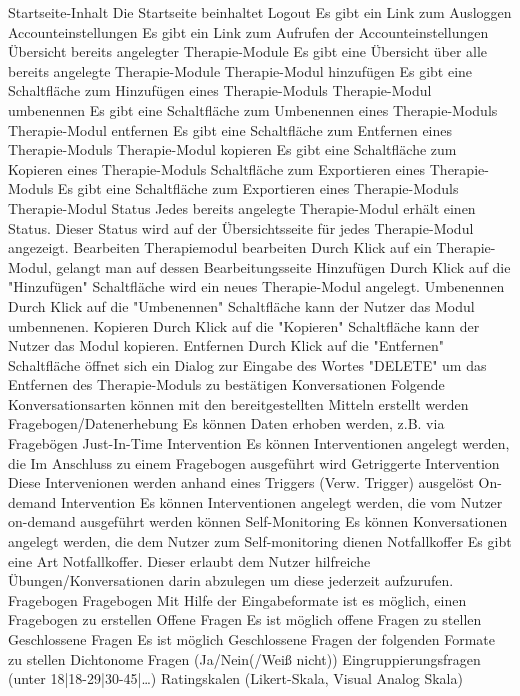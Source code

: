 Startseite-Inhalt		Die Startseite beinhaltet
	Logout	Es gibt ein Link zum Ausloggen
	Accounteinstellungen	Es gibt ein Link zum Aufrufen der Accounteinstellungen
	Übersicht bereits angelegter Therapie-Module	Es gibt eine Übersicht über alle bereits angelegte Therapie-Module
	Therapie-Modul hinzufügen	Es gibt eine Schaltfläche zum Hinzufügen eines Therapie-Moduls
	Therapie-Modul umbenennen	Es gibt eine Schaltfläche zum Umbenennen eines Therapie-Moduls
	Therapie-Modul entfernen	Es gibt eine Schaltfläche zum Entfernen eines Therapie-Moduls
	Therapie-Modul kopieren	Es gibt eine Schaltfläche zum Kopieren eines Therapie-Moduls
	Schaltfläche zum Exportieren eines Therapie-Moduls	Es gibt eine Schaltfläche zum Exportieren eines Therapie-Moduls
	Therapie-Modul Status	Jedes bereits angelegte Therapie-Modul erhält einen Status. Dieser Status wird auf der Übersichtsseite für jedes Therapie-Modul angezeigt.
Bearbeiten	Therapiemodul bearbeiten	Durch Klick auf ein Therapie-Modul, gelangt man auf dessen Bearbeitungsseite
Hinzufügen		Durch Klick auf die "Hinzufügen" Schaltfläche wird ein neues Therapie-Modul angelegt.
Umbenennen		Durch Klick auf die "Umbenennen" Schaltfläche kann der Nutzer das Modul umbennenen.
Kopieren		Durch Klick auf die "Kopieren" Schaltfläche kann der Nutzer das Modul kopieren.
Entfernen		Durch Klick auf die "Entfernen" Schaltfläche öffnet sich ein Dialog zur Eingabe des Wortes "DELETE" um das Entfernen des Therapie-Moduls zu bestätigen
Konversationen	Folgende Konversationsarten können mit den bereitgestellten Mitteln erstellt werden	
	Fragebogen/Datenerhebung	Es können Daten erhoben werden, z.B. via Fragebögen
	Just-In-Time Intervention	Es können Interventionen angelegt werden, die Im Anschluss zu einem Fragebogen ausgeführt wird
	Getriggerte Intervention	Diese Intervenionen werden anhand eines Triggers (Verw. Trigger) ausgelöst
	On-demand Intervention	Es können Interventionen angelegt werden, die vom Nutzer on-demand ausgeführt werden können
	Self-Monitoring	Es können Konversationen angelegt werden, die dem Nutzer zum Self-monitoring dienen
	Notfallkoffer	Es gibt eine Art Notfallkoffer. Dieser erlaubt dem Nutzer hilfreiche Übungen/Konversationen darin abzulegen um diese jederzeit aufzurufen.
Fragebogen	Fragebogen	Mit Hilfe der Eingabeformate ist es möglich, einen Fragebogen zu erstellen
	Offene Fragen	Es ist möglich offene Fragen zu stellen
	Geschlossene Fragen	Es ist möglich Geschlossene Fragen der folgenden Formate zu stellen
		Dichtonome Fragen (Ja/Nein(/Weiß nicht))
		Eingruppierungsfragen (unter 18|18-29|30-45|…)
		Ratingskalen (Likert-Skala, Visual Analog Skala)
